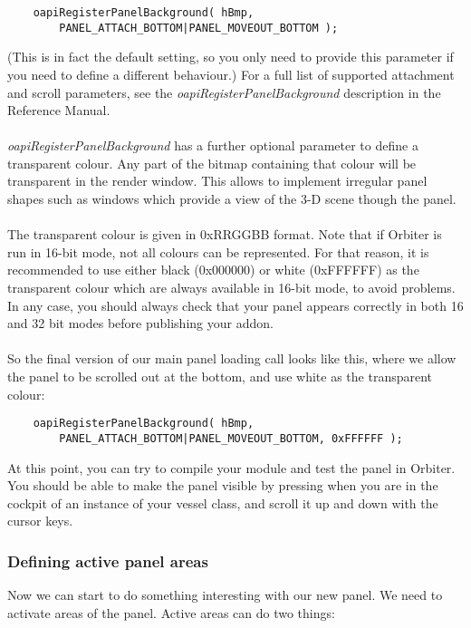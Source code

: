 \documentclass[Orbiter Developer Manual.tex]{subfiles}
\begin{document}
\begin{lstlisting}
	oapiRegisterPanelBackground( hBmp,
		PANEL_ATTACH_BOTTOM|PANEL_MOVEOUT_BOTTOM );
\end{lstlisting}

\noindent
(This is in fact the default setting, so you only need to provide this parameter if you need to define a different behaviour.) For a full list of supported attachment and scroll parameters, see the \textit{oapiRegisterPanelBackground} description in the Reference Manual.\\
\\
\textit{oapiRegisterPanelBackground} has a further optional parameter to define a transparent colour. Any part of the bitmap containing that colour will be transparent in the render window. This allows to implement irregular panel shapes such as windows which provide a view of the 3-D scene though the panel.\\
\\
The transparent colour is given in 0xRRGGBB format. Note that if Orbiter is run in 16-bit mode, not all colours can be represented. For that reason, it is recommended to use either black (0x000000) or white (0xFFFFFF) as the transparent colour which are always available in 16-bit mode, to avoid problems. In any case, you should always check that your panel appears correctly in both 16 and 32 bit modes before publishing your addon.\\
\\
So the final version of our main panel loading call looks like this, where we allow the panel to be scrolled out at the bottom, and use white as the transparent colour:

\begin{lstlisting}
	oapiRegisterPanelBackground( hBmp,
		PANEL_ATTACH_BOTTOM|PANEL_MOVEOUT_BOTTOM, 0xFFFFFF );
\end{lstlisting}

\noindent
At this point, you can try to compile your module and test the panel in Orbiter. You should be able to make the panel visible by pressing  when you are in the cockpit of an instance of your vessel class, and scroll it up and down with the cursor keys.


\subsubsection{Defining active panel areas}
Now we can start to do something interesting with our new panel. We need to activate areas of the panel. Active areas can do two things:
\end{document}
